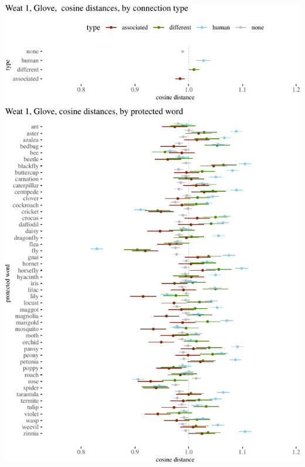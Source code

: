 \documentclass{clv3}
\begin{document}
\begin{center}\includegraphics[width=1\linewidth]{figures/resultsWeat1Glovea} \end{center}
\end{document}
